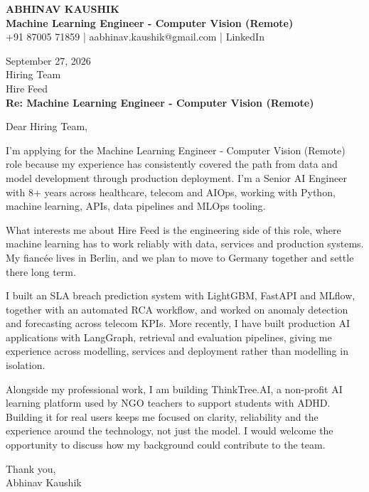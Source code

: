 \documentclass[10pt,a4paper]{article}
\begin{document}
\begin{center}
{\Large\bfseries ABHINAV KAUSHIK}\\[2pt]
{\bfseries Machine Learning Engineer - Computer Vision (Remote)}\\[2pt]
+91 87005 71859 \quad | \quad aabhinav.kaushik@gmail.com \quad | \quad LinkedIn
\end{center}
\vspace{8pt}
September 27, 2026\\[6pt]
Hiring Team\\
Hire Feed\\[4pt]
\textbf{Re: Machine Learning Engineer - Computer Vision (Remote)}

Dear Hiring Team,

I’m applying for the Machine Learning Engineer - Computer Vision (Remote) role because my experience has consistently covered the path from data and model development through production deployment. I’m a Senior AI Engineer with 8+ years across healthcare, telecom and AIOps, working with Python, machine learning, APIs, data pipelines and MLOps tooling.

What interests me about Hire Feed is the engineering side of this role, where machine learning has to work reliably with data, services and production systems. My fiancée lives in Berlin, and we plan to move to Germany together and settle there long term.

I built an SLA breach prediction system with LightGBM, FastAPI and MLflow, together with an automated RCA workflow, and worked on anomaly detection and forecasting across telecom KPIs. More recently, I have built production AI applications with LangGraph, retrieval and evaluation pipelines, giving me experience across modelling, services and deployment rather than modelling in isolation.

Alongside my professional work, I am building ThinkTree.AI, a non-profit AI learning platform used by NGO teachers to support students with ADHD. Building it for real users keeps me focused on clarity, reliability and the experience around the technology, not just the model. I would welcome the opportunity to discuss how my background could contribute to the team.

Thank you,\\
Abhinav Kaushik
\end{document}
